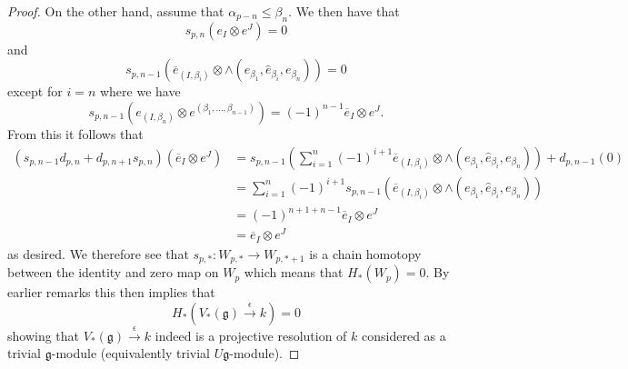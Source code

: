 \begin{proof}
  On the other hand, assume that $ \alpha_{p - n} \leq \beta_n $. We then have that
  \begin{equation}
    s_{p, n}\left( e_{I} \otimes e^{J} \right) = 0
  \end{equation}
  and
  \begin{equation}
    s_{p, n -1} \left( \overline{e}_{(I, \beta_i)} \otimes \wedge \left( e_{\beta_1}, \widehat{e}_{\beta_i}, e_{\beta_n} \right) \right) = 0
  \end{equation}
  except for $ i = n $ where we have
  \begin{equation}
    s_{p, n -1}\left( e_{(I, \beta_n)} \otimes e^{(\beta_1, \ldots, \beta_{n - 1})} \right) = (-1)^{n - 1} \overline{e}_{I} \otimes e^{J}.
  \end{equation}
  From this it follows that
  \begin{align*}
    (s_{p, n-1}d_{p, n} + d_{p, n+1}s_{p, n})(\overline{e}_{I} \otimes e^{J}) &=  s_{p, n-1}\left( \sum_{i = 1}^{n} (-1)^{i + 1}\overline{e}_{(I, \beta_i)} \otimes \wedge\left(e_{\beta_1}, \widehat{e}_{\beta_i}, e_{\beta_n}\right) \right) + d_{p, n-1}(0) \\
                                                                              &= \sum_{i = 1}^{n} (-1)^{i + 1}s_{p, n-1}\left(\overline{e}_{(I, \beta_i)} \otimes \wedge\left(e_{\beta_1}, \widehat{e}_{\beta_i}, e_{\beta_n}\right)\right) \\
                                                                              &= (-1)^{n + 1 + n -1} \overline{e}_{I} \otimes e^{J} \\
                                                                              &= \overline{e}_{I} \otimes e^{J}
  \end{align*}
  as desired. We therefore see that $ s_{p, *}: W_{p, *} \to W_{p, *+1} $ is a chain homotopy between the identity and zero map on $ W_p $ which means that $ H_*(W_p) = 0 $. By earlier remarks this then implies that
  \begin{equation}
    H_*\left( V_*(\mathfrak{g})\xrightarrow{\epsilon} k \right) = 0
  \end{equation}
  showing that $ V_*(\mathfrak{g})\xrightarrow{\epsilon} k $ indeed is a projective resolution of $ k $ considered as a trivial $ \mathfrak{g} $-module (equivalently trivial $ U\mathfrak{g} $-module).
\end{proof}

